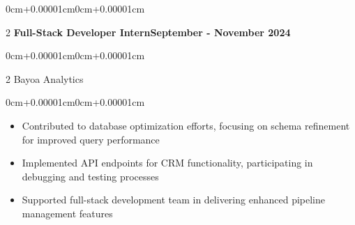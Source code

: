 \documentclass[11pt, letterpaper]{article}
\newenvironment{highlights}{\begin{itemize}[topsep=0.10cm,parsep=0.10cm,partopsep=0pt,itemsep=0pt,leftmargin=0cm+12pt]}{\end{itemize}}
\newenvironment{onecolentry}{\begin{adjustwidth}{0cm+0.00001cm}{0cm+0.00001cm}}{\end{adjustwidth}}
\newenvironment{twocolentry}[2][]{\onecolentry\def\secondColumn{#2}\setcolumnwidth{\fill,5.5cm}\begin{paracol}{2}}{\switchcolumn \raggedleft \secondColumn\end{paracol}\endonecolentry}
\begin{document}
    \begin{twocolentry}{\textbf{September - November 2024}}
    \textbf{Full-Stack Developer Intern}\end{twocolentry}
    \vspace{0.05cm}
    \begin{twocolentry}{}
    Bayoa Analytics\end{twocolentry}
    \vspace{0.10cm}
    \begin{onecolentry}
        \begin{highlights}
            \item Contributed to database optimization efforts, focusing on schema refinement for improved query performance
            \item Implemented API endpoints for CRM functionality, participating in debugging and testing processes
            \item Supported full-stack development team in delivering enhanced pipeline management features
        \end{highlights}
    \end{onecolentry}
    \vspace{0.15cm}
\end{document}
